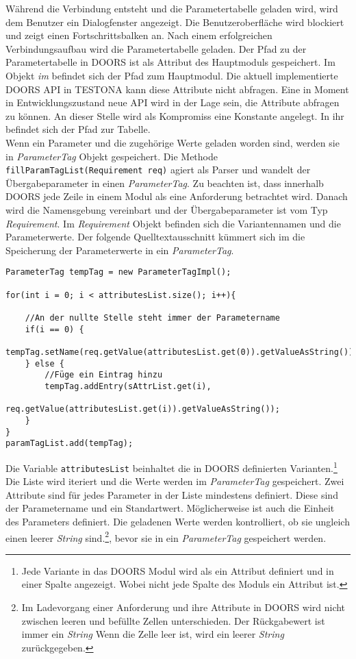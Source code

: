 Während die Verbindung entsteht und die Parametertabelle geladen wird, wird dem Benutzer ein Dialogfenster angezeigt. Die Benutzeroberfläche wird blockiert und zeigt einen Fortschrittsbalken an. Nach einem erfolgreichen Verbindungsaufbau wird die Parametertabelle geladen. Der Pfad zu der Parametertabelle in DOORS ist als Attribut des Hauptmoduls gespeichert. Im Objekt \textit{im} befindet sich der Pfad zum Hauptmodul. Die aktuell implementierte DOORS API in TESTONA kann diese Attribute nicht abfragen. Eine in Moment in Entwicklungszustand neue API wird in der Lage sein, die Attribute abfragen zu können. An dieser Stelle wird als Kompromiss eine Konstante angelegt. In ihr befindet sich der Pfad zur Tabelle.\\

 
Wenn ein Parameter und die zugehörige Werte geladen worden sind, werden sie in \textit{ParameterTag} Objekt gespeichert. Die Methode \texttt{fillParamTagList(Requirement req)} agiert als Parser und wandelt der Übergabeparameter in einen \textit{ParameterTag}. Zu beachten ist, dass innerhalb DOORS jede Zeile in einem Modul als eine Anforderung betrachtet wird. Danach wird die Namensgebung vereinbart und der Übergabeparameter ist vom Typ \textit{Requirement}. Im \textit{Requirement} Objekt befinden sich die Variantennamen und die Parameterwerte. Der folgende Quelltextausschnitt kümmert sich im die Speicherung der Parameterwerte in ein \textit{ParameterTag}.\\


\begin{lstlisting}[caption={Auszug von der Erstellung der ParameterTags}, captionpos=b,label={lst:CreateParamTag}]
ParameterTag tempTag = new ParameterTagImpl();
		
for(int i = 0; i < attributesList.size(); i++){
	
	//An der nullte Stelle steht immer der Parametername
	if(i == 0) {
		tempTag.setName(req.getValue(attributesList.get(0)).getValueAsString());
	} else {
		//Füge ein Eintrag hinzu 
		tempTag.addEntry(sAttrList.get(i),
				req.getValue(attributesList.get(i)).getValueAsString());
	}
}
paramTagList.add(tempTag);
\end{lstlisting}


Die Variable \texttt{attributesList} beinhaltet die in DOORS definierten Varianten.\footnote{Jede Variante in das DOORS Modul wird als ein Attribut definiert und in einer Spalte angezeigt. Wobei nicht jede Spalte des Moduls ein Attribut ist.} Die Liste wird iteriert und die Werte werden im \textit{ParameterTag} gespeichert. Zwei Attribute sind für jedes Parameter in der Liste mindestens definiert. Diese sind der Parametername und ein Standartwert. Möglicherweise ist auch die Einheit des Parameters definiert. Die geladenen Werte werden kontrolliert, ob sie ungleich einen leerer \textit{String} sind.\footnote{Im Ladevorgang einer Anforderung und ihre Attribute in DOORS wird nicht zwischen leeren und befüllte Zellen unterschieden. Der Rückgabewert ist immer ein \textit{String} Wenn die Zelle leer ist, wird ein leerer \textit{String} zurückgegeben.}, bevor sie in ein \textit{ParameterTag} gespeichert werden.\\


